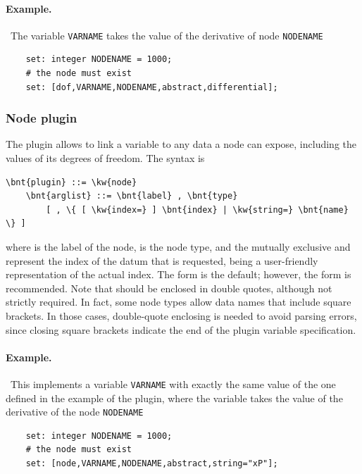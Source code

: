 \paragraph{Example.} \
The variable \texttt{VARNAME} takes the value of the derivative
of  node \texttt{NODENAME}
\begin{verbatim}
    set: integer NODENAME = 1000;
    # the node must exist
    set: [dof,VARNAME,NODENAME,abstract,differential];
\end{verbatim}



\subsubsection{Node plugin}
The  plugin allows to link a variable to any data a node
can expose, including the values of its degrees of freedom.
The syntax is
\begin{Verbatim}[commandchars=\\\{\}]
    \bnt{plugin} ::= \kw{node}
    \bnt{arglist} ::= \bnt{label} , \bnt{type}
        [ , \{ [ \kw{index=} ] \bnt{index} | \kw{string=} \bnt{name} \} ]
\end{Verbatim}
where
 is the label of the node,
 is the node type,
and the mutually exclusive  and  represent the index
of the datum that is requested, \nt{name} being a user-friendly
representation of the actual index.
The  form is the default; however, the  form is recommended.
Note that \nt{name} should be enclosed in double quotes,
although not strictly required.
In fact, some node types allow data names that include square brackets.
In those cases, double-quote enclosing is needed to avoid parsing errors,
since closing square brackets indicate the end
of the plugin variable specification.

\paragraph{Example.} \
This implements a variable \texttt{VARNAME} with exactly the same value
of the one defined in the example of the  plugin,
where the variable takes the value of the derivative
of the \kw{abstract} node \texttt{NODENAME}
\begin{verbatim}
    set: integer NODENAME = 1000;
    # the node must exist
    set: [node,VARNAME,NODENAME,abstract,string="xP"];
\end{verbatim}



